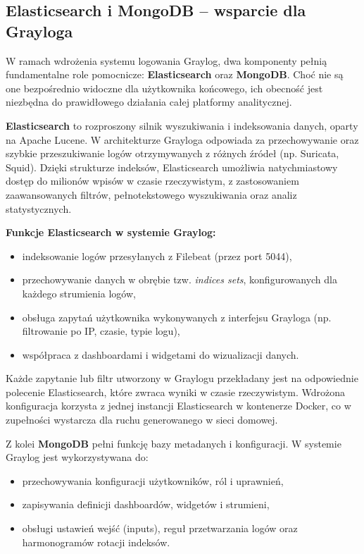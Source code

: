 \documentclass[
    left=2.5cm,         %
    right=2.5cm,        %
    top=2.5cm,          %
    bottom=3cm,         %
    bindingoffset=6mm,  %
    nohyphenation=true %
]{eiti/eiti-thesis} %
\begin{document}
\subsection{Elasticsearch i MongoDB – wsparcie dla Grayloga}

W ramach wdrożenia systemu logowania Graylog, dwa komponenty pełnią fundamentalne role pomocnicze: \textbf{Elasticsearch} oraz \textbf{MongoDB}. Choć nie są one bezpośrednio widoczne dla użytkownika końcowego, ich obecność jest niezbędna do prawidłowego działania całej platformy analitycznej.

\textbf{Elasticsearch} to rozproszony silnik wyszukiwania i indeksowania danych, oparty na Apache Lucene. W architekturze Grayloga odpowiada za przechowywanie oraz szybkie przeszukiwanie logów otrzymywanych z różnych źródeł (np. Suricata, Squid). Dzięki strukturze indeksów, Elasticsearch umożliwia natychmiastowy dostęp do milionów wpisów w czasie rzeczywistym, z zastosowaniem zaawansowanych filtrów, pełnotekstowego wyszukiwania oraz analiz statystycznych.

\textbf{Funkcje Elasticsearch w systemie Graylog:}
\begin{itemize}
    \item indeksowanie logów przesyłanych z Filebeat (przez port 5044),
    \item przechowywanie danych w obrębie tzw. \textit{indices sets}, konfigurowanych dla każdego strumienia logów,
    \item obsługa zapytań użytkownika wykonywanych z interfejsu Grayloga (np. filtrowanie po IP, czasie, typie logu),
    \item współpraca z dashboardami i widgetami do wizualizacji danych.
\end{itemize}

Każde zapytanie lub filtr utworzony w Graylogu przekładany jest na odpowiednie polecenie Elasticsearch, które zwraca wyniki w czasie rzeczywistym. Wdrożona konfiguracja korzysta z jednej instancji Elasticsearch w kontenerze Docker, co w zupełności wystarcza dla ruchu generowanego w sieci domowej.

Z kolei \textbf{MongoDB} pełni funkcję bazy metadanych i konfiguracji. W systemie Graylog jest wykorzystywana do:
\begin{itemize}
    \item przechowywania konfiguracji użytkowników, ról i uprawnień,
    \item zapisywania definicji dashboardów, widgetów i strumieni,
    \item obsługi ustawień wejść (inputs), reguł przetwarzania logów oraz harmonogramów rotacji indeksów.
\end{itemize}
\end{document}
